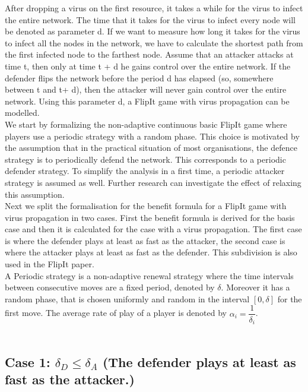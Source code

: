 \documentclass[journal,a4paper]{IEEEtran}
\begin{document}
After dropping a virus on the first resource, it takes a while for the virus to infect
the entire network. The time that it takes for the virus to infect every node will be
denoted as parameter d. If we want to measure how long it takes for the virus to
infect all the nodes in the network, we have to calculate the shortest path from the
first infected node to the farthest node. Assume that an attacker attacks at time t, then only at time t + d he gains control over the entire network. If the defender flips the network before the period d has elapsed (so, somewhere between t and t+ d), then the attacker will never gain control over the entire network. Using this parameter d, a FlipIt game with virus propagation
can be modelled. \\

We start by formalizing the non-adaptive continuous basic FlipIt game where players use a periodic strategy with a random phase. This choice is motivated by the assumption that in the practical situation of most organisations, the defence strategy is to periodically defend the network. This corresponds to a periodic defender strategy.  To simplify the analysis in a first time, a periodic attacker strategy is assumed as well. Further research can investigate the effect of relaxing this assumption. \\

Next we split the formalisation for the benefit formula for a FlipIt game with virus propagation in two cases. First the benefit formula is derived for the basis case and then it is calculated for the case with a virus propagation. The first case is where the defender plays at least as fast as the attacker, the second case is where the attacker plays at least as fast as the defender. This subdivision is also used in the FlipIt paper. \\

 A Periodic strategy is a non-adaptive renewal strategy where the time intervals between consecutive moves are a fixed period, denoted by $\delta$. Moreover it has a random phase, that is chosen uniformly and random in the interval $[0,\delta]$ for the first move. The average rate of play of a player is denoted by $\alpha_{i} = \dfrac{1}{\delta_{i}}$. \\
~~\\


\subsection*{\textbf{Case 1:} $\delta_{D} \leq \delta_{A} $ (The defender plays at least as fast as the attacker.) }
\end{document}
